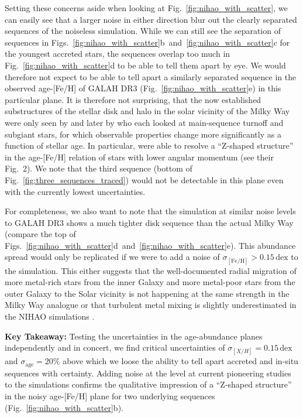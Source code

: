 \documentclass[fleqn,usenatbib]{mnras}
\begin{document}
Setting these concerns aside when looking at Fig.~\ref{fig:nihao_with_scatter}, we can easily see that a larger noise in either direction blur out the clearly separated sequences of the noiseless simulation. While we can still see the separation of sequences in Figs.~\ref{fig:nihao_with_scatter}b~and~\ref{fig:nihao_with_scatter}c for the youngest accreted stars, the sequences overlap too much in Fig.~\ref{fig:nihao_with_scatter}d to be able to tell them apart by eye. We would therefore not expect to be able to tell apart a similarly separated sequence in the observed age-[Fe/H] of GALAH DR3 (Fig.~\ref{fig:nihao_with_scatter}e) in this particular plane. It is therefore not surprising, that the now established substructures of the stellar disk and halo in the solar vicinity of the Milky Way were only seen by \citet[][see their Fig.~4]{Sahlholdt2022} and later by \citet{Xiang2022} who each looked at main-sequence turnoff and subgiant stars, for which observable properties change more significantly as a function of stellar age. In particular, \citet{Xiang2022} were able to resolve a ``Z-shaped structure'' in the age-[Fe/H] relation of stars with lower angular momentum (see their Fig.~2). We note that the third sequence (bottom of Fig.~\ref{fig:three_sequences_traced}) would not be detectable in this plane even with the currently lowest uncertainties.

For completeness, we also want to note that the simulation at similar noise levels to GALAH DR3 shows a much tighter disk sequence than the actual Milky Way (compare the top of Figs.~\ref{fig:nihao_with_scatter}d~and~\ref{fig:nihao_with_scatter}e). This abundance spread would only be replicated if we were to add a noise of $\sigma_\mathrm{[Fe/H]}> 0.15\,\mathrm{dex}$ to the simulation. This either suggests that the well-documented radial migration \citep[e.g.][]{Haywood2008b, Frankel2018} of more metal-rich stars from the inner Galaxy and more metal-poor stars from the outer Galaxy to the Solar vicinity is not happening at the same strength in the Milky Way analogue or that turbulent metal mixing is slightly underestimated in the NIHAO simulations \citep[see also discussion in][]{Buck2021}.

\textbf{Key Takeaway:} Testing the uncertainties in the age-abundance planes independently and in concert, we find critical uncertainties of $\sigma_{[X/H]} = 0.15\,\mathrm{dex}$ and $\sigma_\mathrm{age} = 20\%$ above which we loose the ability to tell apart accreted and in-situ sequences with certainty. Adding noise at the level at current pioneering studies to the simulations confirms the qualitative impression of a ``Z-shaped structure'' \citep{Xiang2022} in the noisy age-[Fe/H] plane for two underlying sequences (Fig.~\ref{fig:nihao_with_scatter}b).
\end{document}
